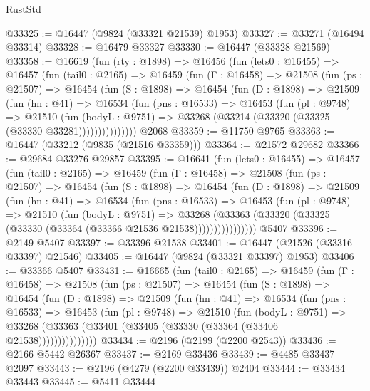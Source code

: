 \begin{lexlean}{RustStd}
\begin{coremodule}
@33325 := @16447 (@9824 (@33321 @21539) @1953)
@33327 := @33271 (@16494 @33314)
@33328 := @16479 @33327
@33330 := @16447 (@33328 @21569)
@33358 := @16619
    (fun (rty : @1898) =>
    @16456
      (fun (lets0 : @16455) =>
      @16457
        (fun (tail0 : @2165) =>
        @16459
          (fun (Γ : @16458) =>
          @21508
            (fun (ps : @21507) =>
            @16454
              (fun (S : @1898) =>
              @16454
                (fun (D : @1898) =>
                @21509
                  (fun (hn : @41) =>
                  @16534
                    (fun (pns : @16533) =>
                    @16453
                      (fun (pl : @9748) =>
                      @21510
                        (fun (bodyL : @9751) =>
                        @33268 (@33214 (@33320 (@33325 (@33330 @33281)))))))))))))))
    @2068
@33359 := @11750 @9765
@33363 := @16447 (@33212 (@9835 (@21516 @33359)))
@33364 := @21572 @29682
@33366 := @29684 @33276 @29857
@33395 := @16641
    (fun (lets0 : @16455) =>
    @16457
      (fun (tail0 : @2165) =>
      @16459
        (fun (Γ : @16458) =>
        @21508
          (fun (ps : @21507) =>
          @16454
            (fun (S : @1898) =>
            @16454
              (fun (D : @1898) =>
              @21509
                (fun (hn : @41) =>
                @16534
                  (fun (pns : @16533) =>
                  @16453
                    (fun (pl : @9748) =>
                    @21510
                      (fun (bodyL : @9751) =>
                      @33268
                        (@33363
                          (@33320 (@33325 (@33330 (@33364 (@33366 @21536 @21538))))))))))))))))
    @5407
@33396 := @2149 @5407
@33397 := @33396 @21538
@33401 := @16447 (@21526 (@33316 @33397) @21546)
@33405 := @16447 (@9824 (@33321 @33397) @1953)
@33406 := @33366 @5407
@33431 := @16665
    (fun (tail0 : @2165) =>
    @16459
      (fun (Γ : @16458) =>
      @21508
        (fun (ps : @21507) =>
        @16454
          (fun (S : @1898) =>
          @16454
            (fun (D : @1898) =>
            @21509
              (fun (hn : @41) =>
              @16534
                (fun (pns : @16533) =>
                @16453
                  (fun (pl : @9748) =>
                  @21510
                    (fun (bodyL : @9751) =>
                    @33268 (@33363 (@33401 (@33405 (@33330 (@33364 (@33406 @21538)))))))))))))))
@33434 := @2196 (@2199 (@2200 @2543))
@33436 := @2166 @5442 @26367
@33437 := @2169 @33436
@33439 := @4485 @33437 @2097
@33443 := @2196 (@4279 (@2200 @33439)) @2404
@33444 := @33434 @33443
@33445 := @5411 @33444

\end{coremodule}
\end{lexlean}
